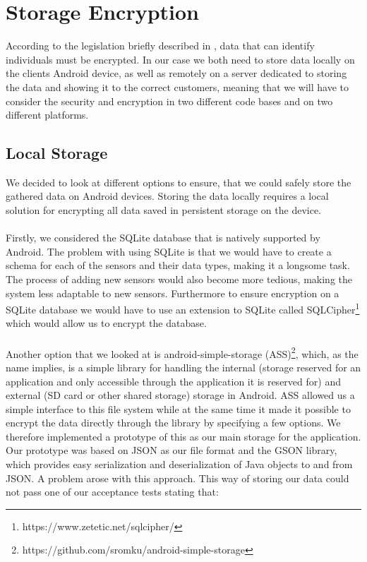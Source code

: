
\section{Storage Encryption}
\label{sec:storage_encryption}
According to the legislation briefly described in , data that can identify individuals must be encrypted. In our case we both need to store data locally on the clients Android device, as well as remotely on a server dedicated to storing the data and showing it to the correct customers, meaning that we will have to consider the security and encryption in two different code bases and on two different platforms. 

\subsection{Local Storage}
\label{sub:local_storage}
We decided to look at different options to ensure, that we could safely store the gathered data on Android devices. Storing the data locally requires a local solution for encrypting all data saved in persistent storage on the device. 
\\\\
Firstly, we considered the SQLite database that is natively supported by Android. The problem with using SQLite is that we would have to create a schema for each of the sensors and their data types, making it a longsome task. The process of adding new sensors would also become more tedious, making the system less adaptable to new sensors. Furthermore to ensure encryption on a SQLite database we would have to use an extension to SQLite called SQLCipher\footnote{https://www.zetetic.net/sqlcipher/} which would allow us to encrypt the database. 
\\\\
Another option that we looked at is android-simple-storage (ASS)\footnote{https://github.com/sromku/android-simple-storage}, which, as the name implies, is a simple library for handling the internal (storage reserved for an application and only accessible through the application it is reserved for) and external (SD card or other shared storage) storage in Android. ASS allowed us a simple interface to this file system while at the same time it made it possible to encrypt the data directly through the library by specifying a few options. We therefore implemented a prototype of this as our main storage for the application. Our prototype was based on JSON as our file format and the GSON library, which provides easy serialization and deserialization of Java objects to and from JSON. A problem arose with this approach. This way of storing our data could not pass one of our acceptance tests stating that:

